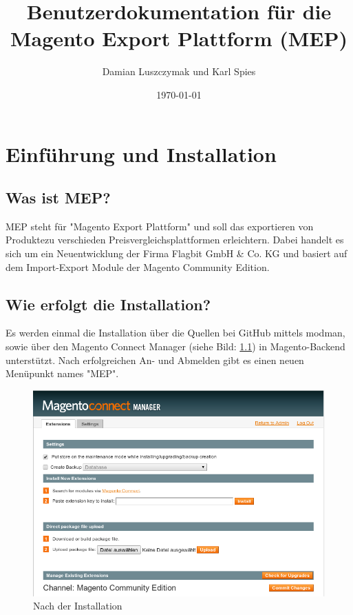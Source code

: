 \documentclass[a4paper,12pt]{book}
\author{Damian Luszczymak und Karl Spies}
\date{\today}
\title{Benutzerdokumentation für die Magento Export Plattform (MEP)}
\begin{document}
\maketitle

\tableofcontents

\pagestyle{plain}

\pagestyle{headings}

\chapter{Einführung und Installation}
\section{Was ist MEP?}
MEP steht für "Magento Export Plattform" und soll das exportieren von
Produktezu verschieden Preisvergleichsplattformen erleichtern. Dabei
handelt es sich um ein Neuentwicklung der Firma Flagbit GmbH \& Co. KG
und basiert auf dem Import-Export Module der Magento Community Edition.

\section{Wie erfolgt die Installation?}
Es werden einmal die Installation über die Quellen bei GitHub mittels
modman, sowie über den Magento Connect Manager (siehe Bild: \ref{figure:install}) in
Magento-Backend unterstützt.  Nach erfolgreichen An- und Abmelden gibt
es einen neuen Menüpunkt names "MEP".

\begin{figure}
 \includegraphics[width=1\textwidth]{img/bild01.png}
  \caption{Nach der Installation}
  \label{figure:install}
\end{figure}
\end{document}
